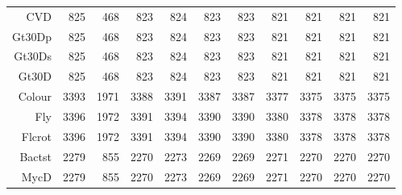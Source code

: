 \begin{table}[p]
\begin{tabular}{rrrrrrrrrrr}
  CVD & 825 & 468 & 823 & 824 & 823 & 823 & 821 & 821 & 821 & 821 \\ 
  Gt30Dp & 825 & 468 & 823 & 824 & 823 & 823 & 821 & 821 & 821 & 821 \\ 
  Gt30Ds & 825 & 468 & 823 & 824 & 823 & 823 & 821 & 821 & 821 & 821 \\ 
  Gt30D & 825 & 468 & 823 & 824 & 823 & 823 & 821 & 821 & 821 & 821 \\ 
  Colour & 3393 & 1971 & 3388 & 3391 & 3387 & 3387 & 3377 & 3375 & 3375 & 3375 \\ 
  Fly & 3396 & 1972 & 3391 & 3394 & 3390 & 3390 & 3380 & 3378 & 3378 & 3378 \\ 
  Flcrot & 3396 & 1972 & 3391 & 3394 & 3390 & 3390 & 3380 & 3378 & 3378 & 3378 \\ 
  Bactst & 2279 & 855 & 2270 & 2273 & 2269 & 2269 & 2271 & 2270 & 2270 & 2270 \\ 
  MycD & 2279 & 855 & 2270 & 2273 & 2269 & 2269 & 2271 & 2270 & 2270 & 2270 \\ 
   \hline
\end{tabular}
\normalsize
\end{table}
